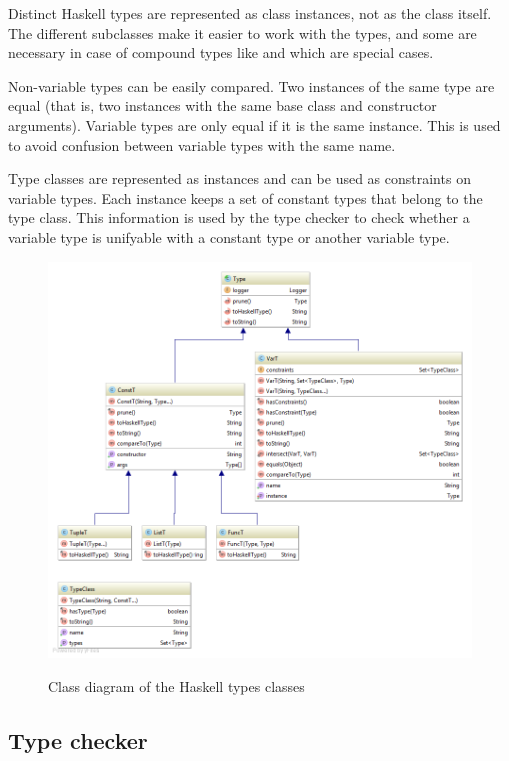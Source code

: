 Distinct Haskell types are represented as class instances, not as the class itself. The different  subclasses make it easier to work with the types, and some are necessary in case of compound types like  and  which are special cases.

Non-variable types can be easily compared. Two instances of the same type are equal (that is, two instances with the same base class and constructor arguments).
Variable types are only equal if it is the same instance. This is used to avoid confusion between variable types with the same name.

Type classes are represented as  instances and can be used as constraints on variable types.
Each  instance keeps a set of constant types that belong to the type class.
This information is used by the type checker to check whether a variable type is unifyable with a constant type or another variable type.

\begin{figure}[h]
\centering
\includegraphics[scale=0.4]{Images/classdiagram-type}
\label{fig:classdiagram-type}
\caption{Class diagram of the Haskell types classes}
\end{figure}

\subsection{Type checker}

